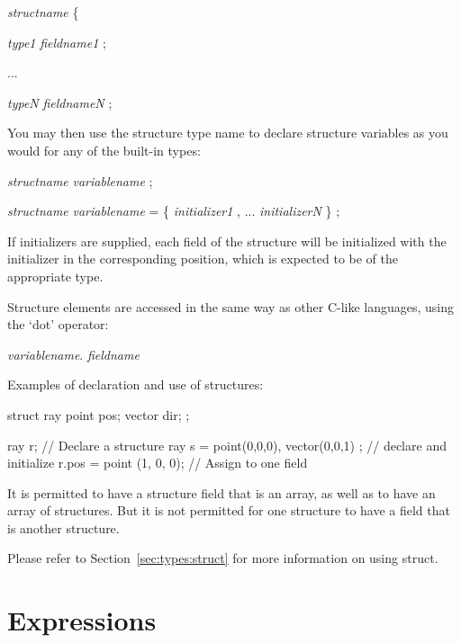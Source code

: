 \documentclass[11pt,letterpaper]{book}
\begin{document}
\vspace{12pt}
 \emph{structname} {\cf \{} 

\spc\spc \emph{type1} \emph{fieldname1} {\cf ;}

\spc\spc ...

\spc\spc \emph{typeN} \emph{fieldnameN} {\cf ;}

\spc {\cf \} ;}
\vspace{12pt}

You may then use the structure type name to declare structure variables
as you would for any of the built-in types:

\vspace{12pt}
\spc \emph{structname} \emph{variablename} {\cf ;}

\spc \emph{structname} \emph{variablename} {\cf = \{ }
\emph{initializer1} {\cf ,} ... \emph{initializerN} {\cf \} ;}
\vspace{12pt}

If initializers are supplied, each field of the structure will be
initialized with the initializer in the corresponding position, which
is expected to be of the appropriate type.

Structure elements are accessed in the same way as other C-like
languages, using the `dot' operator: 

\vspace{12pt}
\spc \emph{variablename}{\cf .} \emph{fieldname}
\vspace{12pt}

Examples of declaration and use of structures:

\begin{code}
    struct ray {
        point pos;
        vector dir;
    };

    ray r;   // Declare a structure
    ray s = { point(0,0,0), vector(0,0,1) };  // declare and initialize
    r.pos = point (1, 0, 0);  // Assign to one field
\end{code}

It is permitted to have a structure field that is an array, as well as
to have an array of structures.  But it is not permitted for one
structure to have a field that is another structure.

Please refer to Section~\ref{sec:types:struct} for more information
on using {\cf struct}.


\section{Expressions}
\label{sec:expressions}
\end{document}
